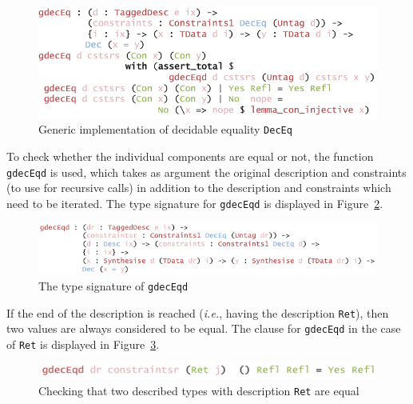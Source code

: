 \documentclass{ituthesis}
\newcommand{\ttconstructor}[1]{\textcolor{constructor-color}{\texttt{#1}}}
\newcommand{\tttype}[1]{\textcolor{type-color}{\texttt{#1}}}
\newcommand{\ttdec}[1]{\textcolor{declared-var-color}{\texttt{#1}}}
\theoremstyle{break}
\begin{document}
\begin{figure}[ht]
\begin{center}
    \includegraphics[scale=0.5]{Figures/GenericDecEq.png}
\end{center}
\caption{Generic implementation of decidable equality \tttype{DecEq}}
\label{fig:deceqgen}
\end{figure}

To check whether the individual components are equal or not, the function \ttdec{gdecEqd} is used, which takes as argument the original description and constraints (to use for recursive calls)
in addition to the description and constraints which need to be iterated.
The type signature for \ttdec{gdecEqd} is displayed in Figure~\ref{fig:deceqgendescty}.

\begin{figure}[ht]
\begin{center}
    \includegraphics[scale=0.5]{Figures/GenericDecEqDescType.png}
\end{center}
\caption{The type signature of \ttdec{gdecEqd}}
\label{fig:deceqgendescty}
\end{figure}

If the end of the description is reached (\textit{i.e.}, having the description \ttconstructor{Ret}), then two values are always considered to be equal.
The clause for \ttdec{gdecEqd} in the case of \ttconstructor{Ret} is displayed in Figure~\ref{fig:deceqgendesc1}.

\begin{figure}[ht]
\begin{center}
    \includegraphics[scale=0.5]{Figures/GenericDecEqDesc1.png}
\end{center}
\caption{Checking that two described types with description \ttconstructor{Ret} are equal}
\label{fig:deceqgendesc1}
\end{figure}
\end{document}
